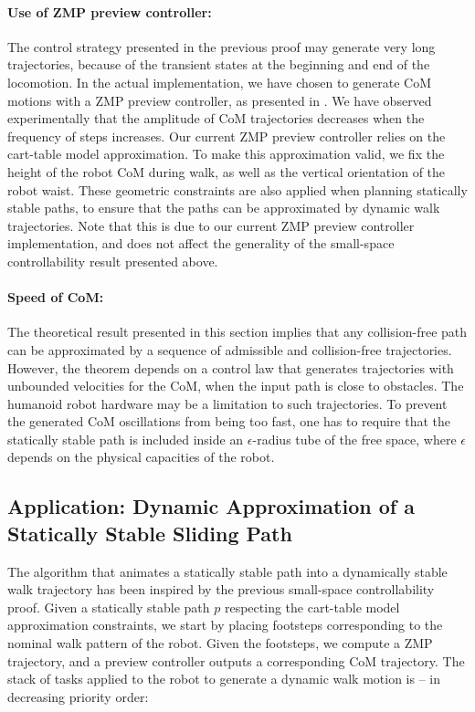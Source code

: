 \documentclass{article}
\begin{document}
\paragraph{Use of ZMP preview controller:} The control strategy presented in the  
previous proof may
generate very  long trajectories, because  of the transient  states at
the beginning and end of the locomotion. In the actual implementation,
we have chosen  to generate  CoM motions with  a ZMP preview  controller, as
presented in \cite{kajita2003biped}.  We  have observed experimentally that the
amplitude of  CoM trajectories decreases  when the frequency  of steps
increases. Our current ZMP preview controller relies on the cart-table model approximation.
To make this approximation valid, we fix the height of the robot CoM during walk,
as well as the vertical orientation of the robot waist. These geometric constraints 
are also applied when planning statically stable paths, to ensure that the paths
can be approximated by dynamic walk trajectories. Note that this is
due to our current  ZMP preview controller implementation, and does not affect
the generality of the small-space controllability result presented above.

\paragraph{Speed of CoM:} The theoretical result presented in this section implies
that any collision-free path can be approximated by a sequence of admissible 
and collision-free trajectories. However, the theorem depends on a control law
that generates trajectories with unbounded velocities for the CoM, when the input
path is close to obstacles. The humanoid robot
hardware may be a limitation to such trajectories. To prevent the generated CoM 
oscillations from being too fast, one has to require that the statically stable 
path is included
inside an $\epsilon$-radius tube of the free space, where $\epsilon$ depends on the
physical capacities of the robot.




\subsection{Application: Dynamic Approximation of a Statically Stable Sliding Path}
\label{sec:ssc-application}


The  algorithm   that  animates  a  statically  stable   path  into  a
dynamically stable  walk trajectory has been inspired  by the previous
small-space controllability  proof.
Given a statically  stable path $p$ respecting the cart-table model approximation constraints,
we  start  by placing  footsteps  corresponding  to  the nominal  walk
pattern  of the  robot. Given the footsteps, we  compute a ZMP trajectory, 
and a preview controller outputs  a corresponding CoM trajectory. 
The stack of tasks applied to
the robot to generate a dynamic walk motion is -- in decreasing priority order:
\end{document}

